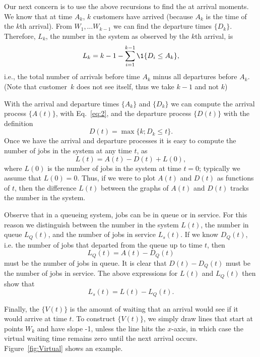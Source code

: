 Our next concern is to use the above recursions to find the  at arrival moments. We know that at time $A_k$, $k$ customers
have arrived (because $A_k$ is the time of the $k$th arrival). From
$W_1, \ldots W_{k-1}$ we can find the departure times
$\{D_k\}$. Therefore, $L_k$, the number in the system as observed by
the $k$th arrival, is
\begin{equation}\label{eq:55}
  L_k = k-1-\sum_{i=1}^{k-1} \1{D_i \leq A_k},
\end{equation}
i.e., the total number of arrivals before time $A_k$ minus all
departures before $A_k$. (Note that customer~$k$ does not see itself,
thus we take $k-1$ and not $k$)


With the arrival and departure times $\{A_k\}$ and $\{D_k\}$ we can
compute the arrival process $\{A(t)\}$, with Eq.~\eqref{eq:2}, and the
departure process $\{D(t)\}$ with the definition
\begin{equation*}
D(t) = \max\{k; D_k \leq t\}.
\end{equation*}
Once we have the arrival and departure processes it is easy to compute
the number of jobs in the system at any time $t$, as
\begin{equation}\label{eq:14}
  L(t) = A(t) - D(t) + L(0),
\end{equation}
where $L(0)$ is the number of jobs in the system at time $t=0$;
typically we assume that $L(0)=0$. Thus, if we were to plot $A(t)$ and
$D(t)$ as functions of $t$, then the difference $L(t)$ between the
graphs of $A(t)$ and $D(t)$ tracks the number in the system.  

Observe that in a queueing system, jobs can be in queue or in
service. For this reason we distinguish between the number in the
system $L(t)$, the number in queue $L_Q(t)$, and the number of jobs in
service $L_s(t)$. If we know $D_Q(t)$, i.e. the number of jobs that
departed from the queue up to time $t$, then
\begin{equation*}
  L_Q(t) = A(t) - D_Q(t)
\end{equation*}
must be the number of jobs in queue. It is clear that $D(t) - D_Q(t)$
must be the number of jobs in service. The above expressions for
$L(t)$ and $L_Q(t)$ then show that 
\begin{equation*}
L_s(t) = L(t) - L_Q(t).
\end{equation*}

Finally, the  $\{V(t)\}$ is the amount of
waiting that an arrival would see if it would arrive at time $t$. To
construct $\{V(t)\}$, we simply draw lines that start at points $W_k$
and have slope -1, unless the line hits the $x$-axis, in which case
the virtual waiting time remains zero until the next arrival occurs.
Figure~\ref{fig:Virtual} shows an example.


